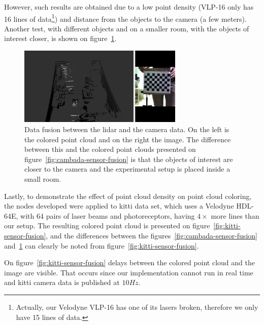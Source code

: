 However, such results are obtained due to a low point density (VLP-16 only has 16 lines of data\footnote{Actually, our Velodyne VLP-16 has one of its lasers broken, therefore we only have 15 lines of data.}) and distance from the objects to the camera (a few meters). Another test, with different objects and on a smaller room, with the objects of interest closer, is shown on figure~\ref{fig:dark-room-sensor-fusion}.

\begin{figure}[H]
	\centering
	\includegraphics[width=0.7\textwidth]{img/sensor_fusion/dark-room-sensor-fusion.png}
	\caption{Data fusion between the \ac{lidar} and the camera data. On the left is the colored point cloud and on the right the image. The difference between this and the colored point clouds presented on figure~\ref{fig:cambada-sensor-fusion} is that the objects of interest are closer to the camera and the experimental setup is placed inside a small room.}
	\label{fig:dark-room-sensor-fusion}
\end{figure}

Lastly, to demonstrate the effect of point cloud density on point cloud coloring, the nodes developed were applied to \ac{kitti} data set, which uses a Velodyne HDL-64E, with 64 pairs of laser beams and photoreceptors, having $4\times$ more lines than our setup. The resulting colored point cloud is presented on figure~\ref{fig:kitti-sensor-fusion}, and the differences between the figures~\ref{fig:cambada-sensor-fusion} and~\ref{fig:dark-room-sensor-fusion} can clearly be noted from figure~\ref{fig:kitti-sensor-fusion}. 

On figure~\ref{fig:kitti-sensor-fusion} delays between the colored point cloud and the image are visible. That occurs since our implementation cannot run in real time and \ac{kitti} camera data is published at $10 Hz$.


